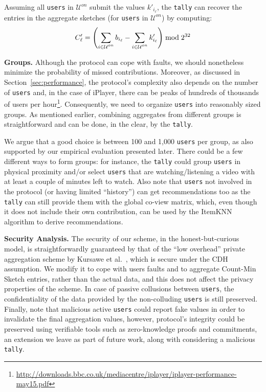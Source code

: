 \documentclass[conference]{IEEEtran}
\newcommand{\descr}[1]{\medskip \noindent \textbf{#1}}
\newcommand{\Uon}{\mathcal{U}^{on}}
\newcommand{\users}{{\tt users}\xspace}
\newcommand{\tally}{{\tt tally}\xspace}
\begin{document}
Assuming all \users in $\Uon$ submit the values $k'_{i_\ell}$, the \tally can recover the entries in the aggregate sketches (for \users in $\Uon$) by computing:
$$C'_{\ell} = \left( \sum_{\substack{i \in \Uon }}b_{i_\ell} - \sum_{\substack{i \in \Uon }}k'_{i_\ell} \right) \bmod 2^{32}\vspace{-0.2cm}$$







\descr{Groups.} Although the protocol can cope with faults, 
we should nonetheless minimize the probability of missed contributions. Moreover, as discussed in Section~\ref{sec:performance}, the protocol's complexity also depends on the number of \users and, in the case of iPlayer, there can be peaks of hundreds of thousands of users per hour\footnote{\url{http://downloads.bbc.co.uk/mediacentre/iplayer/iplayer-performance-may15.pdf}}. Consequently, we need to organize \users into reasonably sized groups. 
As mentioned earlier, combining aggregates from different groups is straightforward and can be done, in the clear, by the \tally.

We argue that a good choice is between 100 and 1,000 \users per group, as also supported by our empirical evaluation presented later.
There could be a few different ways to form groups: for instance, the \tally could group \users in physical proximity and/or select \users that are  watching/listening a video with at least a couple of minutes left to watch.
Also note that \users not involved in the protocol (or having limited ``history'') can get recommendations too as the \tally can still provide them with the global co-view matrix, which, even though it does not include their own contribution, can be used by the ItemKNN algorithm to derive recommendations.


\descr{Security Analysis.}
The security of our scheme, in the honest-but-curious model, is straightforwardly guaranteed by that of the ``low overhead'' private aggregation scheme by Kursawe et al.~\cite{Kursawe:2011}, which is secure under the CDH assumption.
We modify it
to cope with users faults and to aggregate Count-Min Sketch entries, rather than the actual data, and this does not affect the privacy properties of the scheme.
In case of passive collusions between \users, the confidentiality of the data provided by the non-colluding \users is still preserved.
Finally, note that malicious active \users could report fake values in order to invalidate the final aggregation values, however, protocol's integrity could be preserved using verifiable tools such as zero-knowledge proofs and commitments, an extension we leave as part of future work,
along with considering a malicious \tally.
\end{document}

